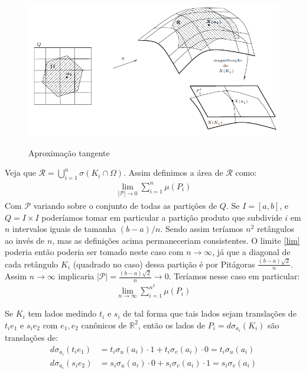 \documentclass[12pt,letterpaper]{article}
\newcommand\rcur{\mathcal{R}}
\newcommand{\rr}{\mathbb{R}^2}
\begin{document}
		\begin{figure}[!htb]
			\centering
			\includegraphics[scale=0.7]{../images/fff_fig1.png}
			\label{fig1}
			\caption{Aproximação tangente}
		\end{figure}
	
		Veja que $\rcur=\displaystyle\bigcup_{i=1}^n\sigma(K_i\cap\Omega)$. Assim definimos a área de $\rcur$ como:
		\begin{align}
			\displaystyle\lim_{|\mathscr{P}|\to0}\sum_{i=1}^n\mu(P_i)\label{lim}
		\end{align}
		Com $\mathscr{P}$ variando sobre o conjunto de todas as partições de $Q$. Se $I=[a,b]$, e $Q=I\times I$ poderíamos tomar em particular a partição produto que subdivide $i$ em $n$ intervalos iguais de tamanha $(b-a)/n$. Sendo assim teríamos $n^2$ retângulos ao invés de $n$, mas as definições acima permaneceriam consistentes. O limite \ref{lim} poderia então poderia ser tomado neste caso com $n\to\infty$, já que a diagonal de cada retângulo $K_i$ (quadrado no caso) dessa partição é por Pitágoras $\frac{(b-a)\sqrt2}n$. Assim $n\to\infty$ implicaria $|\mathscr{P}|=\frac{(b-a)\sqrt2}n\to 0$. Teríamos nesse caso em particular:
		\begin{align*}
			\displaystyle\lim_{n\to\infty}\sum_{i=1}^{n^2}\mu(P_i)
		\end{align*}
	
	 Se $K_i$ tem lados medindo $t_i$ e $s_i$ de tal forma que tais lados sejam translações de $t_ie_1$ e $s_ie_2$ com $e_1,e_2$ canônicos de $\rr$, então os lados de $P_i=d\sigma_{a_i}(K_i)$ são translações de:
	 \begin{align*}
	 	d\sigma_{a_i}(t_ie_1)&=t_i\sigma_u(a_i)\cdot1+t_i\sigma_v(a_i)\cdot0=t_i\sigma_u(a_i)\\
	 	d\sigma_{a_i}(s_ie_2)&=s_i\sigma_u(a_i)\cdot0+s_i\sigma_v(a_i)\cdot1=s_i\sigma_v(a_i)
	 \end{align*}
 
\end{document}

